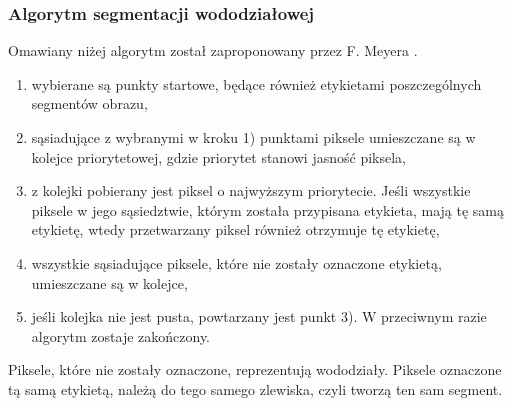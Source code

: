 \subsubsection{Algorytm segmentacji wododziałowej}
Omawiany niżej algorytm został zaproponowany przez F. Meyera \cite{beucher93}.
\begin{enumerate}
  \item wybierane są punkty startowe, będące również etykietami poszczególnych segmentów obrazu,
  \item sąsiadujące z wybranymi w kroku 1) punktami piksele umieszczane są w kolejce priorytetowej, gdzie priorytet stanowi jasność piksela,
  \item z kolejki pobierany jest piksel o najwyższym priorytecie. Jeśli wszystkie piksele w jego sąsiedztwie, którym została przypisana etykieta, mają tę samą etykietę, wtedy przetwarzany piksel również otrzymuje tę etykietę,
  \item wszystkie sąsiadujące piksele, które nie zostały oznaczone etykietą, umieszczane są w kolejce,
  \item jeśli kolejka nie jest pusta, powtarzany jest punkt 3). W przeciwnym razie algorytm zostaje zakończony.
\end{enumerate}
Piksele, które nie zostały oznaczone, reprezentują wododziały. Piksele oznaczone tą samą etykietą, należą do tego samego zlewiska, czyli tworzą ten sam segment.
